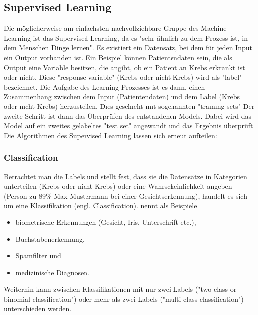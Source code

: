 \subsection{Supervised Learning}
Die möglicherweise am einfachsten nachvollziehbare Gruppe des Machine Learning ist das Supervised Learning, da es "sehr ähnlich zu dem Prozess ist, in dem Menschen Dinge lernen"\citep[S.~13; eigene Übersetzung]{kim_matlab_2017}. Es existiert ein Datensatz, bei dem für jeden Input ein Output vorhanden ist. Ein Beispiel können Patientendaten sein, die als Output eine Variable besitzen, die angibt, ob ein Patient an Krebs erkrankt ist oder nicht.\citep[S.~222]{ramasubramanian_machine_2017} Diese "response variable" (Krebs oder nicht Krebs) wird als "label"\citep[S.~222]{ramasubramanian_machine_2017} bezeichnet. Die Aufgabe des Learning Prozesses ist es dann, einen Zusammenhang zwischen dem Input (Patientendaten) und dem Label (Krebs oder nicht Krebs) herzustellen. Dies geschieht mit sogenannten "training sets"\citep[S.~5]{paluszek_matlab_2017} Der zweite Schritt ist dann das Überprüfen des entstandenen Models. Dabei wird das Model auf ein zweites gelabeltes "test set"\citep[S.~5]{paluszek_matlab_2017} angewandt und das Ergebnis überprüft%
Die Algorithmen des Supervised Learning lassen sich erneut aufteilen:

\subsubsection{Classification}
Betrachtet man die Labels und stellt fest, dass sie die Datensätze in Kategorien unterteilen (Krebs oder nicht Krebs) oder eine Wahrscheinlichkeit angeben (Person zu 89\% Max Mustermann bei einer Gesichtserkennung), handelt es sich um eine Klassifikation (engl. Classification).\citep[S.~67]{swamynathan_mastering_2017} \citep[S.~5]{kauchak_zoterovoll2.pdf_2016} nennt als Beispiele
\begin{itemize}
\item biometrische Erkennungen (Gesicht, Iris, Unterschrift etc.),
\item Buchstabenerkennung,
\item Spamfilter und
\item medizinische Diagnosen.
\end{itemize}
Weiterhin kann zwischen Klassifikationen mit nur zwei Labels ("two-class or binomial classification"\citep{ericson_how_2017}) oder mehr als zwei Labels ("multi-class classification"\citep{ericson_how_2017}) unterschieden werden.


